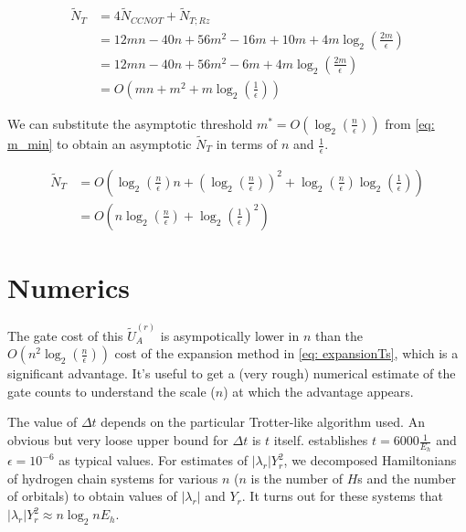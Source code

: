 \begin{equation}
    \begin{split}
        \tilde{N}_{T} &= 4\tilde{N}_{CCNOT} + \tilde{N}_{T; Rz} \\
        &= 12mn - 40n + 56m^2 - 16m + 10m + 4m\log_2(\frac{2m}{\epsilon}) \\
        &= 12mn - 40n + 56m^2 - 6m + 4m\log_2(\frac{2m}{\epsilon}) \\
        &= O(mn + m^2 + m\log_2(\frac{1}{\epsilon})) \label{eq: Ts_mneps}
    \end{split}
\end{equation}

We can substitute the asymptotic threshold $m^* = O(\log_2(\frac{n}{\epsilon}))$ from \eqref{eq: m_min} to obtain an asymptotic $\tilde{N}_{T}$ in terms of $n$ and $\frac{1}{\epsilon}$.

\begin{equation}
    \begin{split}
        \tilde{N}_{T} &= O(\log_2(\frac{n}{\epsilon})n + (\log_2(\frac{n}{\epsilon}))^2 + \log_2(\frac{n}{\epsilon})\log_2(\frac{1}{\epsilon})) \\
        &= O(n\log_2(\frac{n}{\epsilon}) + \log_2(\frac{1}{\epsilon})^2) \label{eq: Ts_neps}
    \end{split}
\end{equation}

\section{Numerics}

The gate cost of this $\tilde{U}_A^{(r)}$ is asympotically lower in $n$ than the $O(n^2\log_2(\frac{n}{\epsilon}))$ cost of the expansion method in \eqref{eq: expansionTs}, which is a significant advantage. It's useful to get a (very rough) numerical estimate of the gate counts to understand the scale ($n$) at which the advantage appears.

The value of $\Delta t$ depends on the particular Trotter-like algorithm used. An obvious but very loose upper bound for $\Delta t$ is $t$ itself. \cite{Gate_Count} establishes $t = 6000 \frac{1}{E_h}$ and $\epsilon = 10^{-6}$ as typical values. For estimates of $|\lambda_r|Y_r^2$, we decomposed Hamiltonians of hydrogen chain systems for various $n$ ($n$ is the number of $H$s and the number of orbitals) to obtain values of $|\lambda_r|$ and $Y_r$. It turns out for these systems that $|\lambda_r|Y_r^2 \approx n\log_2{n} E_h$.

